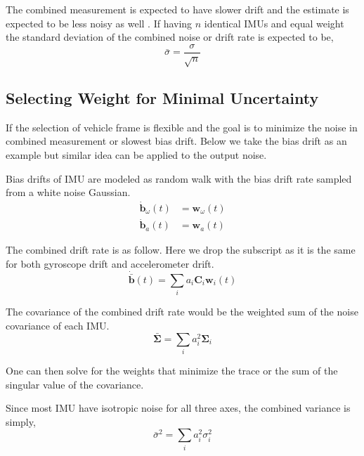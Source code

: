 \documentclass[conference]{IEEEtran}
\begin{document}
The combined measurement is expected to have slower drift and the estimate is expected to be less noisy as well \cite{patel2022_multi-imu}. If having $n$ identical IMUs and equal weight the standard deviation of the combined noise or drift rate is expected to be,
\begin{equation}
    \bar{\sigma} = \frac{\sigma}{\sqrt{n}}
\end{equation}

\subsection{Selecting Weight for Minimal Uncertainty}\label{solve_weight_by_noise}

If the selection of vehicle frame is flexible and the goal is to minimize the noise in combined measurement or slowest bias drift. Below we take the bias drift as an example but similar idea can be applied to the output noise.

Bias drifts of IMU are modeled as random walk with the bias drift rate sampled from a white noise Gaussian.
\begin{equation}
\begin{split}
    \dot{\textbf{b}}_\omega(t) &= \textbf{w}_\omega(t) \\
    \dot{\textbf{b}}_a(t) &= \textbf{w}_a(t)
\end{split}
\end{equation}

The combined drift rate is as follow. Here we drop the subscript as it is the same for both gyroscope drift and accelerometer drift.
\begin{equation}
    \dot{\bar{\textbf{b}}}(t) = \sum_i{a_i \textbf{C}_i \textbf{w}_i(t)}
\end{equation}

The covariance of the combined drift rate would be the weighted sum of the noise covariance of each IMU.
\begin{equation}
    \bar{\bm{\Sigma}} = \sum_i{a_i^2 \bm{\Sigma}_i}
\end{equation}

One can then solve for the weights that minimize the trace or the sum of the singular value of the covariance.

Since most IMU have isotropic noise for all three axes, the combined variance is simply,
\begin{equation}
    \bar{\sigma}^2 = \sum_i{a_i^2 \sigma_i^2}
\end{equation}
\end{document}
